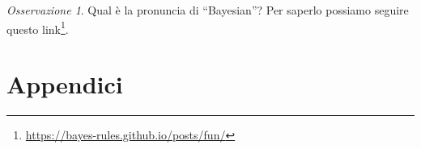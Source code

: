 \documentclass[
  11pt,
]{krantz}
\renewcommand{\href}[2]{#2\footnote{\url{#1}}}
\theoremstyle{definition}
\theoremstyle{definition}
\theoremstyle{definition}
\theoremstyle{definition}
\theoremstyle{remark}
\newtheorem*{remark}{Osservazione}
\begin{document}
\begin{remark}
Qual è la pronuncia di ``Bayesian''? Per saperlo possiamo seguire \href{https://bayes-rules.github.io/posts/fun/}{questo link}.
\end{remark}

\mainmatter

\hypertarget{part-appendici}{%
\part{Appendici}\label{part-appendici}}

\hypertarget{appendix-appendici}{%
\appendix {}}


  

\printindex
\end{document}
